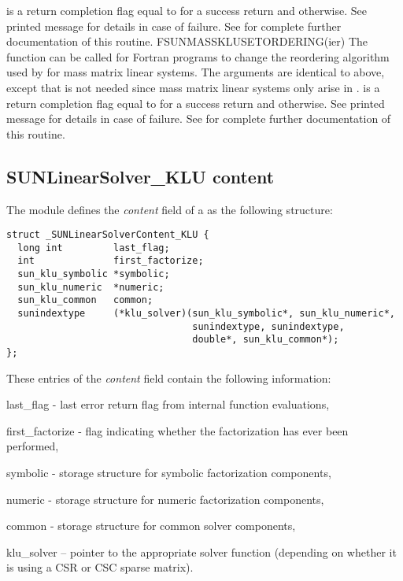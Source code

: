 {
   is a  return completion flag equal to  for a success
  return and  otherwise. See printed message for details in case
  of failure.
}
{
  See  for complete further documentation of
  this routine. 
}
%
%
{
  FSUNMASSKLUSETORDERING(ier)
}
{
  The function  can be called for Fortran programs
  to change the reordering algorithm used by {\klu} for mass matrix linear systems.
}
{
  The arguments are identical to  above, except that
   is not needed since mass matrix linear systems only arise
  in {\arkode}.
}
{
   is a  return completion flag equal to  for a success
  return and  otherwise. See printed message for details in case
  of failure.
}
{
  See  for complete further documentation of
  this routine. 
}


\subsection{SUNLinearSolver\_KLU content}
\label{ss:sunlinsol_klu_content}

The {\sunlinsolklu} module defines the \textit{content} field of a
 as the following structure:
\begin{verbatim} 
struct _SUNLinearSolverContent_KLU {
  long int         last_flag;
  int              first_factorize;
  sun_klu_symbolic *symbolic;
  sun_klu_numeric  *numeric;
  sun_klu_common   common;
  sunindextype     (*klu_solver)(sun_klu_symbolic*, sun_klu_numeric*,
                                 sunindextype, sunindextype,
                                 double*, sun_klu_common*);
};
\end{verbatim}
These entries of the \emph{content} field contain the following
information:
\begin{args}
  \item[last\_flag] - last error return flag from internal function evaluations,
  \item[first\_factorize] - flag indicating whether the factorization
    has ever been performed, 
  \item[symbolic] - {\klu} storage structure for symbolic factorization components,
  \item[numeric] - {\klu} storage structure for numeric factorization components,
  \item[common] - storage structure for common {\klu} solver components,
  \item[klu\_solver] -- pointer to the appropriate {\klu} solver function
    (depending on whether it is using a CSR or CSC sparse matrix).
\end{args}

